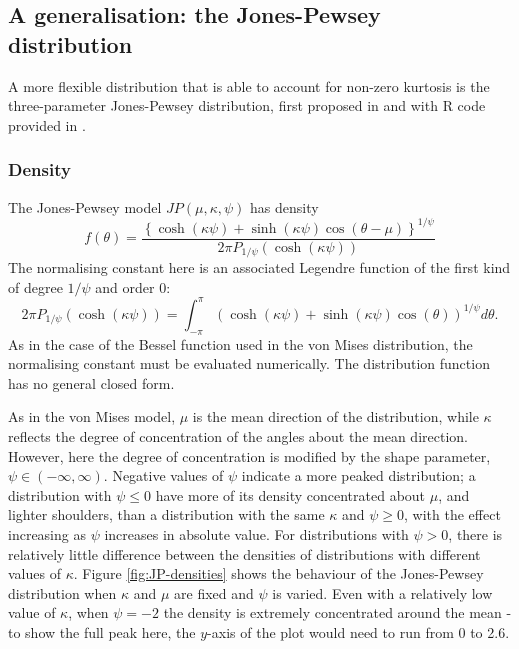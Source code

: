 \documentclass[../../ArchStats.tex]{subfiles}
\begin{document}


\subsection{A generalisation: the Jones-Pewsey distribution}
\label{sec:Jones-Pewsey}
A more flexible distribution that is able to account for non-zero kurtosis is the three-parameter Jones-Pewsey distribution, first proposed in \cite{Jones2005} and with R code provided in \cite{Pewsey2014}.

\subsubsection{Density}
The Jones-Pewsey model $JP(\mu, \kappa, \psi)$ has density
	\begin{equation}
	f(\theta) = \frac{\left\lbrace \cosh(\kappa\psi) + \sinh(\kappa\psi) \cos(\theta - \mu) \right\rbrace ^ {1/\psi}}{2\pi P_{1/\psi}(\cosh(\kappa\psi))}
	\end{equation}
The normalising constant here is an associated Legendre function of the first kind of degree $1/\psi$ and order 0:
	\begin{equation}
	2\pi P_{1/\psi}(\cosh(\kappa\psi)) = \int_{-\pi}^\pi \left( \cosh(\kappa \psi) + \sinh(\kappa\psi)\cos(\theta)\right)^{1/\psi}d\theta.
	\end{equation}
As in the case of the Bessel function used in the von Mises distribution, the normalising constant must be evaluated numerically. The distribution function has no general closed form.

As in the von Mises model, $\mu$ is the mean direction of the distribution, while $\kappa$ reflects the degree of concentration of the angles about the mean direction. However, here the degree of concentration is modified by the shape parameter, $\psi \in (-\infty, \infty)$. Negative values of $\psi$ indicate a more peaked distribution; a distribution with $\psi \leq 0$ have more of its density concentrated about $\mu$, and lighter shoulders, than a distribution with the same $\kappa$ and $\psi \geq 0$, with the effect increasing as $\psi$ increases in absolute value. For distributions with $\psi > 0$, there is relatively little difference between the densities of distributions with different values of $\kappa$. Figure \ref{fig:JP-densities} shows the behaviour of the Jones-Pewsey distribution when $\kappa$ and $\mu$ are fixed and $\psi$ is varied. Even with a relatively low value of $\kappa$, when $\psi = -2$ the density is extremely concentrated around the mean - to show the full peak here, the $y$-axis of the plot would need to run from 0 to 2.6.
\end{document}
